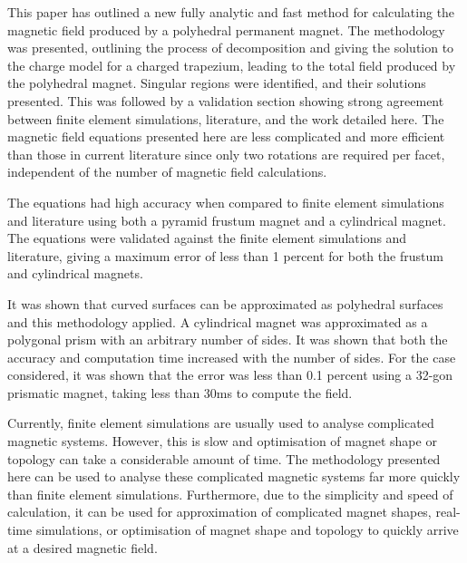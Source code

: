 This paper has outlined a new fully analytic and fast method for calculating the magnetic field produced by a polyhedral permanent magnet. The methodology was presented, outlining the process of decomposition and giving the solution to the charge model for a charged trapezium, leading to the total field produced by the polyhedral magnet. Singular regions were identified, and their solutions presented. This was followed by a validation section showing strong agreement between finite element simulations, literature, and the work detailed here. The magnetic field equations presented here are less complicated and more efficient than those in current literature since only two rotations are required per facet, independent of the number of magnetic field calculations.

The equations had high accuracy when compared to finite element simulations and literature using both a pyramid frustum magnet and a cylindrical magnet. The equations were validated against the finite element simulations and literature, giving a maximum error of less than 1 percent for both the frustum and cylindrical magnets.

It was shown that curved surfaces can be approximated as polyhedral surfaces and this methodology applied. A cylindrical magnet was approximated as a polygonal prism with an arbitrary number of sides. It was shown that both the accuracy and computation time increased with the number of sides. For the case considered, it was shown that the error was less than 0.1 percent using a 32-gon prismatic magnet, taking less than 30\si{\milli\second} to compute the field.

Currently, finite element simulations are usually used to analyse complicated magnetic systems. However, this is slow and optimisation of magnet shape or topology can take a considerable amount of time. The methodology presented here can be used to analyse these complicated magnetic systems far more quickly than finite element simulations. Furthermore, due to the simplicity and speed of calculation, it can be used for approximation of complicated magnet shapes, real-time simulations, or optimisation of magnet shape and topology to quickly arrive at a desired magnetic field.